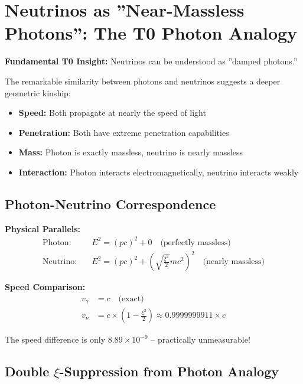 \documentclass[12pt,a4paper]{article}
\newcommand{\xipar}{\xi}
\begin{document}
	\section{Neutrinos as ''Near-Massless Photons'': The T0 Photon Analogy}
	
	\begin{speculation}
		\textbf{Fundamental T0 Insight:} Neutrinos can be understood as ''damped photons.''
		
		The remarkable similarity between photons and neutrinos suggests a deeper geometric kinship:
		\begin{itemize}
			\item \textbf{Speed:} Both propagate at nearly the speed of light
			\item \textbf{Penetration:} Both have extreme penetration capabilities
			\item \textbf{Mass:} Photon is exactly massless, neutrino is nearly massless
			\item \textbf{Interaction:} Photon interacts electromagnetically, neutrino interacts weakly
		\end{itemize}
	\end{speculation}
	
	\subsection{Photon-Neutrino Correspondence}
	
	\begin{important}
		\textbf{Physical Parallels:}
		\begin{align}
			\text{Photon:} \quad &E^2 = (pc)^2 + 0 \quad \text{(perfectly massless)} \\
			\text{Neutrino:} \quad &E^2 = (pc)^2 + \left(\sqrt{\frac{\xipar^2}{2}} m c^2\right)^2 \quad \text{(nearly massless)}
		\end{align}
		
		\textbf{Speed Comparison:}
		\begin{align}
			v_\gamma &= c \quad \text{(exact)} \\
			v_\nu &= c \times \left(1 - \frac{\xipar^2}{2}\right) \approx 0.9999999911 \times c
		\end{align}
		
		The speed difference is only \(8.89 \times 10^{-9}\) -- practically unmeasurable!
	\end{important}
	
	\subsection{Double \(\xipar\)-Suppression from Photon Analogy}
	
\end{document}
